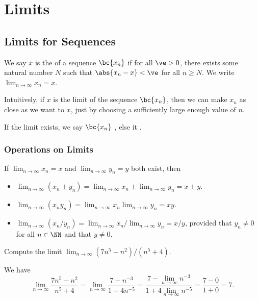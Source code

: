 \chapter{Limits}

\section{Limits for Sequences}

\begin{definition}
    We say $x$ is the  of a sequence $\bc{x_n}$ if for all $\ve > 0$, there exists some natural number $N$ such that $\abs{x_n - x} < \ve$ for all $n \geq N$. We write $\displaystyle\lim_{n \to \infty} x_n = x$.
\end{definition}

Intuitively, if $x$ is the limit of the sequence $\bc{x_n}$, then we can make $x_n$ as close as we want to $x$, just by choosing a sufficiently large enough value of $n$.

If the limit exists, we say $\bc{x_n}$ , else it .

\subsection{Operations on Limits}

\begin{fact}
    If $\displaystyle\lim_{n \to \infty} x_n = x$ and $\displaystyle\lim_{n \to \infty} y_n = y$ both exist, then
    \begin{itemize}
        \item $\displaystyle\lim_{n \to \infty} (x_n \pm y_n) = \lim_{n \to \infty} x_n \pm \lim_{n \to \infty} y_n = x \pm y$.
        \item $\displaystyle\lim_{n \to \infty} (x_n y_n) = \lim_{n \to \infty} x_n \lim_{n \to \infty} y_n = xy$.
        \item $\displaystyle\lim_{n \to \infty} (x_n/y_n) = \lim_{n \to \infty} x_n / \lim_{n \to \infty} y_n = x/y$, provided that $y_n \neq 0$ for all $n \in \NN$ and that $y \neq 0$.
    \end{itemize}
\end{fact}

\begin{sample}
    Compute the limit $\lim_{n \to \infty} (7n^5 - n^2)/(n^5 + 4)$.
\end{sample}
\begin{sampans}
    We have \[\lim_{n \to \infty} \frac{7n^5 - n^2}{n^5 + 4} = \lim_{n \to \infty} \frac{7 - n^{-3}}{1 + 4n^{-5}} = \frac{7 - \lim_{n \to \infty} n^{-3}}{1 + 4\lim_{n \to \infty} n^{-5}} = \frac{7 - 0}{1 + 0} = 7.\]
\end{sampans}

